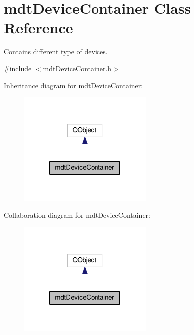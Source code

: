 \hypertarget{classmdt_device_container}{\section{mdt\-Device\-Container Class Reference}
\label{classmdt_device_container}
}


Contains different type of devices.  




{\ttfamily \#include $<$mdt\-Device\-Container.\-h$>$}



Inheritance diagram for mdt\-Device\-Container\-:\nopagebreak
\begin{figure}[H]
\begin{center}
\leavevmode
\includegraphics[width=184pt]{classmdt_device_container__inherit__graph}
\end{center}
\end{figure}


Collaboration diagram for mdt\-Device\-Container\-:\nopagebreak
\begin{figure}[H]
\begin{center}
\leavevmode
\includegraphics[width=184pt]{classmdt_device_container__coll__graph}
\end{center}
\end{figure}
